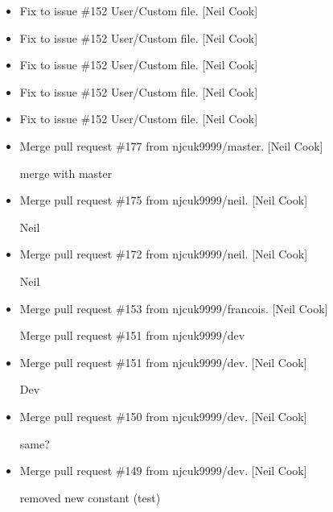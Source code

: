 \documentclass[a4paper,10pt,english]{report}
\begin{document}
\begin{itemize}
\item {} 
Fix to issue \#152 \sphinxhyphen{} User/Custom  file. {[}Neil Cook{]}

\item {} 
Fix to issue \#152 \sphinxhyphen{} User/Custom  file. {[}Neil Cook{]}

\item {} 
Fix to issue \#152 \sphinxhyphen{} User/Custom  file. {[}Neil Cook{]}

\item {} 
Fix to issue \#152 \sphinxhyphen{} User/Custom  file. {[}Neil Cook{]}

\item {} 
Fix to issue \#152 \sphinxhyphen{} User/Custom  file. {[}Neil Cook{]}

\item {} 
Merge pull request \#177 from njcuk9999/master. {[}Neil Cook{]}

merge with master

\item {} 
Merge pull request \#175 from njcuk9999/neil. {[}Neil Cook{]}

Neil

\item {} 
Merge pull request \#172 from njcuk9999/neil. {[}Neil Cook{]}

Neil

\item {} 
Merge pull request \#153 from njcuk9999/francois. {[}Neil Cook{]}

Merge pull request \#151 from njcuk9999/dev

\item {} 
Merge pull request \#151 from njcuk9999/dev. {[}Neil Cook{]}

Dev

\item {} 
Merge pull request \#150 from njcuk9999/dev. {[}Neil Cook{]}

same?

\item {} 
Merge pull request \#149 from njcuk9999/dev. {[}Neil Cook{]}

removed new constant (test)

\end{itemize}
\end{document}
